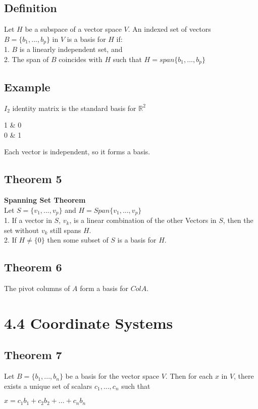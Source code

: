 \documentclass{article}
\begin{document}
    \subsection*{Definition}
    Let  $H$ be a subspace of a vector space $V$. An indexed set of vectors $B = \{b_1,...,b_p\}$
    in $V$ is a basis for $H$ if:\\
    1. $B$ is a linearly independent set, and\\
    2. The span of $B$ coincides with $H$ such that $H=span\{b_1,...,b_p \}$
    
    \subsection*{Example}
    $I_2$ identity matrix is the standard basis for $\mathbb{R}^2$\\
    \begin{center}
        \begin{bmatrix*}[r]
            1 & 0\\
            0 & 1
        \end{bmatrix*}
    \end{center}
    Each vector is independent, so it forms a basis.


    \subsection*{Theorem 5}
    \textbf{Spanning Set Theorem}\\
    Let $S = \{v_1,...,v_p\}$ and $H = Span\{v_1,...,v_p\}$\\
    1. If a vector in $S$, $v_k$, is a linear combination of the other Vectors in $S$, then the 
    set without $v_k$ still spans $H$.\\
    2. If $H \neq \{0\}$ then some subset of $S$ is a basis for $H$.
    

    \subsection*{Theorem 6}
    The pivot columns of $A$ form a basis for $Col A$.

    

    \section*{4.4 Coordinate Systems}
    \subsection*{Theorem 7}
    Let $B =\{b_1,...,b_n\}$ be a basis for the vector space $V$. Then for each $x$ in $V$, there
    exists a unique set of scalars $c_1,...,c_n$ such that 
    \begin{center}
        $x = c_1b_1+c_2b_2+...+c_nb_n$
    \end{center}
\end{document}
